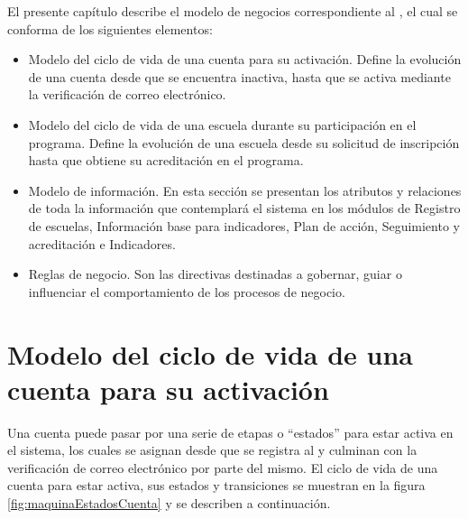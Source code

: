 
El presente capítulo describe el modelo de negocios correspondiente al \saear , el cual se conforma de los siguientes elementos:

\begin{itemize}

    \item Modelo del ciclo de vida de una cuenta para su activación. Define la evolución de una cuenta desde que se encuentra inactiva, hasta que se activa mediante la verificación de correo electrónico.
    
    \item Modelo del ciclo de vida de una escuela durante su participación en el programa. Define la evolución de una escuela desde su solicitud de inscripción hasta que obtiene su acreditación en el programa.

    \item Modelo de información. En esta sección se presentan los atributos y relaciones de toda la información que contemplará el sistema en los módulos de Registro de escuelas, Información base para indicadores, Plan de acción, Seguimiento y acreditación e Indicadores.

    \item Reglas de negocio. Son las directivas destinadas a gobernar, guiar o influenciar el comportamiento de los procesos de negocio.

\end{itemize}

\section{Modelo del ciclo de vida de una cuenta para su activación} \label{subsec:cuenta:maquina} \hypertarget{subsec:cuenta:maquina}{}

Una cuenta puede pasar por una serie de etapas o ``estados'' para estar activa en el sistema, los cuales se asignan desde que se registra al  y culminan con la verificación de correo electrónico por parte del mismo. El ciclo de vida de una cuenta para estar activa, sus estados y transiciones se muestran en la figura \ref{fig:maquinaEstadosCuenta} y se describen a continuación.


